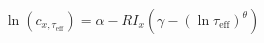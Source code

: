 \documentclass[a5paper]{article}
\begin{document}
\LARGE
\pagestyle{empty}
\[
\ln\left(c_{x,\tau_\mathrm{eff}}\right) = \alpha - RI_x\left(\gamma-\left(\ln \tau_\mathrm{eff} \right)^\theta \right)
\]
\end{document}
